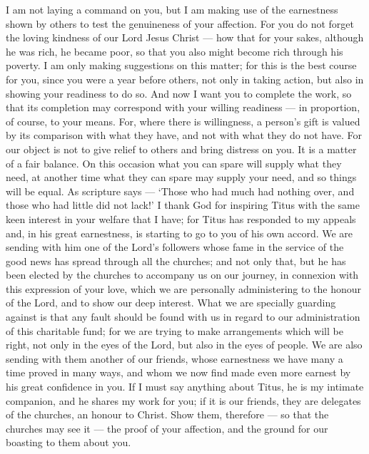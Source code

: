  I am not laying a command on you, but I am making use of
the earnestness shown by others to test the genuineness of your
affection.  For you do not forget the loving kindness of our
Lord Jesus Christ --- how that for your sakes, although he was rich, he
became poor, so that you also might become rich through his poverty.
 I am only making suggestions on this matter; for this is
the best course for you, since you were a year before others, not only
in taking action, but also in showing your readiness to do so.
 And now I want you to complete the work, so that its
completion may correspond with your willing readiness --- in proportion,
of course, to your means.  For, where there is willingness,
a person's gift is valued by its comparison with what they have, and not
with what they do not have.  For our object is not to give
relief to others and bring distress on you. It is a matter of a fair
balance.  On this occasion what you can spare will supply
what they need, at another time what they can spare may supply your
need, and so things will be equal.  As scripture says ---
`Those who had much had nothing over, and those who had little did not
lack!'  I thank God for inspiring Titus with the same keen
interest in your welfare that I have;  for Titus has
responded to my appeals and, in his great earnestness, is starting to go
to you of his own accord.  We are sending with him one of
the Lord's followers whose fame in the service of the good news has
spread through all the churches;  and not only that, but he
has been elected by the churches to accompany us on our journey, in
connexion with this expression of your love, which we are personally
administering to the honour of the Lord, and to show our deep interest.
 What we are specially guarding against is that any fault
should be found with us in regard to our administration of this
charitable fund;  for we are trying to make arrangements
which will be right, not only in the eyes of the Lord, but also in the
eyes of people.  We are also sending with them another of
our friends, whose earnestness we have many a time proved in many ways,
and whom we now find made even more earnest by his great confidence in
you.  If I must say anything about Titus, he is my intimate
companion, and he shares my work for you; if it is our friends, they are
delegates of the churches, an honour to Christ.  Show them,
therefore --- so that the churches may see it --- the proof of your
affection, and the ground for our boasting to them about you.

